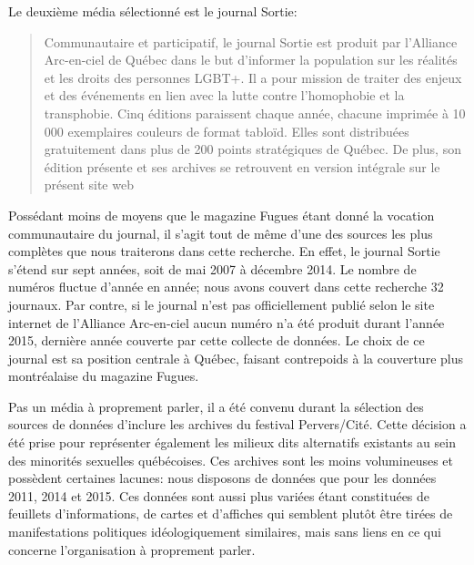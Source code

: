 

Le deuxième média sélectionné est le journal Sortie:
\blockquote[{\cite{AllianceArc2014}}][.]{ Communautaire et participatif, le journal Sortie est produit par l’Alliance Arc-en-ciel de Québec dans le but d’informer la population sur les réalités et les droits des personnes LGBT+.
  Il a pour mission de traiter des enjeux et des événements en lien avec la lutte contre l’homophobie et la transphobie. 
Cinq éditions paraissent chaque année, chacune imprimée à 10 000 exemplaires couleurs de format tabloïd. 
Elles sont distribuées gratuitement dans plus de 200 points stratégiques de Québec.
  De plus, son édition présente et ses archives se retrouvent en version intégrale sur le présent site web} 
Possédant moins de moyens que le magazine Fugues étant donné la vocation communautaire du journal, il s'agit tout de même d'une des sources les plus complètes que nous traiterons dans cette recherche.
En effet, le journal Sortie s'étend sur sept années, soit de mai 2007 à décembre 2014. 
Le nombre de numéros fluctue d'année en année; nous avons couvert dans cette recherche 32 journaux. 
Par contre, si le journal n'est pas officiellement publié selon le site internet de l'Alliance Arc-en-ciel aucun numéro n'a été produit durant l'année 2015, dernière année couverte par cette collecte de données. 
Le choix de ce journal est sa position centrale à Québec, faisant contrepoids à la couverture plus montréalaise du magazine Fugues.

Pas un média à proprement parler, il a été convenu durant la sélection des sources de données d'inclure les archives du festival Pervers/Cité. 
Cette décision a été prise pour représenter également les milieux dits alternatifs existants au sein des minorités sexuelles québécoises. 
Ces archives sont les moins volumineuses et possèdent certaines lacunes: nous disposons de données que pour les données 2011, 2014 et 2015. 
Ces données sont aussi plus variées étant constituées de feuillets d'informations, de cartes et d'affiches qui semblent plutôt être tirées de manifestations politiques idéologiquement similaires, mais sans liens en ce qui concerne l'organisation à proprement parler.

